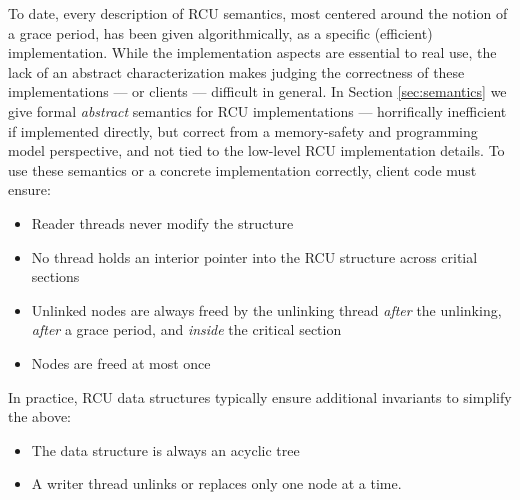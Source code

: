 To date, every description of RCU semantics, most centered around the notion of a grace period, has been given algorithmically, as a specific (efficient) implementation.  While the implementation aspects are essential to real use, the lack of an abstract characterization makes judging the correctness of these implementations --- or clients --- difficult in general. In Section \ref{sec:semantics} we give formal \emph{abstract} semantics for RCU implementations --- horrifically inefficient if implemented directly, but correct from a memory-safety and programming model perspective, and not tied to the low-level RCU implementation details.
To use these semantics or a concrete implementation correctly, client code must ensure:
\begin{itemize}
\item Reader threads never modify the structure
\item No thread holds an interior pointer into the RCU structure across critial sections
\item Unlinked nodes are always freed by the unlinking thread \emph{after} the unlinking, \emph{after} a grace period, and \emph{inside} the critical section
\item Nodes are freed at most once
\end{itemize}
In practice, RCU data structures typically ensure additional invariants to simplify the above:
\begin{itemize}
\item The data structure is always an acyclic tree
\item A writer thread unlinks or replaces only one node at a time. 
\end{itemize}

